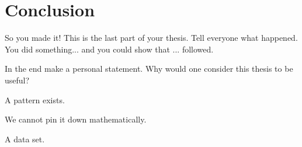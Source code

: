 \chapter{Conclusion}\label{chapter:conclusion} \label{ch:conclusions}
So you made it!
This is the last part of your thesis.
Tell everyone what happened.
You did something... and you could show that ... followed.

In the end make a personal statement.
Why would one consider this thesis to be useful?


A pattern exists.

We cannot pin it down mathematically.

A data set.


